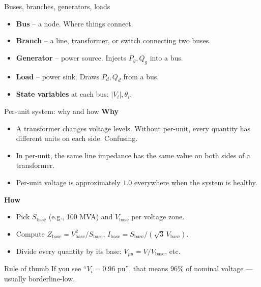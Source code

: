 \documentclass[aspectratio=169,10pt]{beamer}
\begin{document}
\begin{frame}{Buses, branches, generators, loads}
\centering
{}
\vspace{0.6em}
\begin{itemize}
  \item \textbf{Bus} -- a node. Where things connect.
  \item \textbf{Branch} -- a line, transformer, or switch connecting two buses.
  \item \textbf{Generator} -- power source. Injects $P_g, Q_g$ into a bus.
  \item \textbf{Load} -- power sink. Draws $P_d, Q_d$ from a bus.
  \item \textbf{State variables} at each bus: $|V_i|, \theta_i$.
\end{itemize}
\end{frame}

\begin{frame}{Per-unit system: why and how}
\textbf{Why}
\begin{itemize}
  \item A transformer changes voltage levels. Without per-unit, every quantity has different units on each side. Confusing.
  \item In per-unit, the same line impedance has the same value on both sides of a transformer.
  \item Per-unit voltage is approximately $1.0$ everywhere when the system is healthy.
\end{itemize}
\vspace{0.4em}
\textbf{How}
\begin{itemize}
  \item Pick $S_{\text{base}}$ (e.g., 100 MVA) and $V_{\text{base}}$ per voltage zone.
  \item Compute $Z_{\text{base}} = V_{\text{base}}^2 / S_{\text{base}}$, $I_{\text{base}} = S_{\text{base}}/(\sqrt{3}\, V_{\text{base}})$.
  \item Divide every quantity by its base: $V_{pu} = V/V_{\text{base}}$, etc.
\end{itemize}
\begin{alertblock}{Rule of thumb}
If you see ``$V_i = 0.96$ pu'', that means $96\%$ of nominal voltage --- usually borderline-low.
\end{alertblock}
\end{frame}
\end{document}
